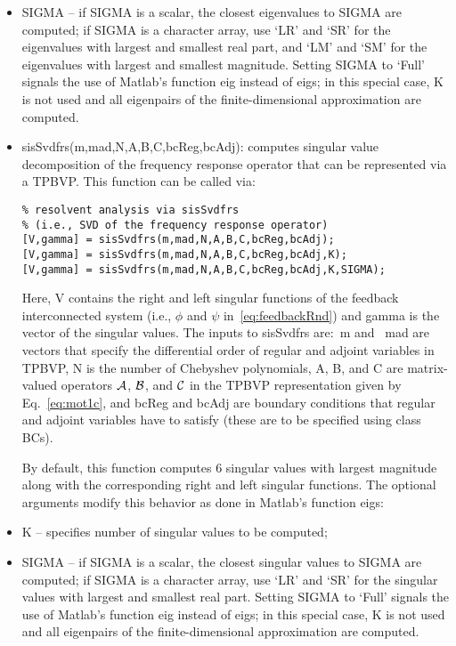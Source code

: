 \documentclass[%
secnumarabic,%
 amssymb, amsmath,%
 aps,prf,superscriptaddress,longbibliography
frontmatterverbose,
]{revtex4-2}
\begin{document}
\begin{itemize}
   \item {\sf SIGMA} -- if {\sf SIGMA} is a scalar, the closest eigenvalues to {\sf SIGMA} are computed; if {\sf SIGMA} is a character array, use `LR' and `SR' for the eigenvalues with largest and smallest real part, and `LM' and `SM' for the eigenvalues with largest and smallest magnitude.
   \ei
  Setting {\sf SIGMA} to {\sf `Full'} signals the use of Matlab's function {\sf eig} instead of {\sf eigs}; in this special case,
  {\sf K} is not used and all eigenpairs of the finite-dimensional approximation are computed.
  \item {\sf sisSvdfrs(m,mad,N,A,B,C,bcReg,bcAdj):} computes singular value decomposition of the frequency response operator that can be represented via a TPBVP. This function can be called via:   
\begin{lstlisting} 
% resolvent analysis via sisSvdfrs
% (i.e., SVD of the frequency response operator) 
[V,gamma] = sisSvdfrs(m,mad,N,A,B,C,bcReg,bcAdj);
[V,gamma] = sisSvdfrs(m,mad,N,A,B,C,bcReg,bcAdj,K);
[V,gamma] = sisSvdfrs(m,mad,N,A,B,C,bcReg,bcAdj,K,SIGMA);
\end{lstlisting}   
Here, {\sf V} contains the right and left singular functions of the feedback interconnected system (i.e., $\phi$ and $\psi$ in~\eqref{eq:feedbackRnd}) and {\sf gamma} is the vector of the singular values. The inputs to {\sf sisSvdfrs} are:~{\sf m} and ~{\sf mad} are vectors that specify the differential order of regular and adjoint variables in TPBVP, {\sf N} is the number of Chebyshev polynomials, {\sf A}, {\sf B}, and {\sf C} are matrix-valued operators $\mathcal{A}$, $\mathcal{B}$, and $\mathcal{C}$ in the TPBVP representation given by Eq.~\eqref{eq:mot1c}, and {\sf bcReg} and {\sf bcAdj} are boundary conditions that regular and adjoint variables have to satisfy (these are to be specified using class {\sf BCs}).  

  By default, this function computes 6 singular values with largest magnitude along with the corresponding right and left singular functions. The optional arguments modify this behavior as done in Matlab's function {\sf eigs}: 
  \bi
\item {\sf K} -- specifies number of singular values to be computed;

\item {\sf SIGMA} -- if {\sf SIGMA} is a scalar, the closest singular values to {\sf SIGMA} are computed; if {\sf SIGMA} is a character array, use `LR' and `SR' for the singular values with largest and smallest real part.
\ei
Setting {\sf SIGMA} to {\sf `Full'} signals the use of Matlab's function {\sf eig} instead of {\sf eigs}; in this special case,
{\sf K} is not used and all eigenpairs of the finite-dimensional approximation are computed.
      

\end{itemize}
\end{document}

